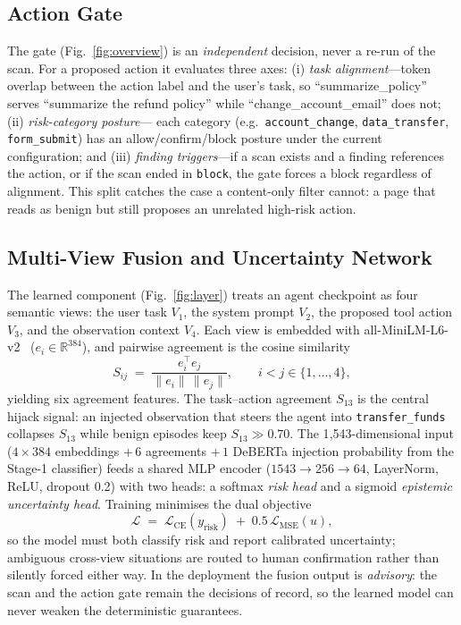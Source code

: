 \documentclass[journal]{IEEEtran}
\begin{document}
\subsection{Action Gate}
The gate (Fig.~\ref{fig:overview}) is an \emph{independent} decision, never
a re-run of the scan. For a proposed action it evaluates three axes:
(i) \emph{task alignment}---token overlap between the action label and the
user's task, so ``summarize\_policy'' serves ``summarize the refund policy''
while ``change\_account\_email'' does not; (ii) \emph{risk-category posture}---
each category (e.g.\ \texttt{account\_change}, \texttt{data\_transfer},
\texttt{form\_submit}) has an allow/confirm/block posture under the current
configuration; and (iii) \emph{finding triggers}---if a scan exists and a
finding references the action, or if the scan ended in \texttt{block}, the
gate forces a block regardless of alignment. This split catches the case a
content-only filter cannot: a page that reads as benign but still proposes an
unrelated high-risk action.

\subsection{Multi-View Fusion and Uncertainty Network}
\label{sec:fusion}
The learned component (Fig.~\ref{fig:layer}) treats an agent checkpoint as
four semantic views: the user task $V_1$, the system prompt $V_2$, the
proposed tool action $V_3$, and the observation context $V_4$. Each view is
embedded with all-MiniLM-L6-v2~\cite{reimers2019} ($e_i \in
\mathbb{R}^{384}$), and pairwise agreement is the cosine similarity
\begin{equation}
S_{ij} \;=\; \frac{e_i^{\!\top} e_j}{\lVert e_i\rVert\,\lVert e_j\rVert},
\qquad i<j \in \{1,\dots,4\},
\label{eq:cosine}
\end{equation}
yielding six agreement features. The task--action agreement $S_{13}$ is the
central hijack signal: an injected observation that steers the agent into
\texttt{transfer\_funds} collapses $S_{13}$ while benign episodes keep
$S_{13}\gg 0.70$. The 1{,}543-dimensional input
($4\times384$ embeddings $+\,6$ agreements $+\,1$ DeBERTa injection
probability from the Stage-1 classifier) feeds a shared MLP encoder
($1543\!\to\!256\!\to\!64$, LayerNorm, ReLU, dropout 0.2) with two heads: a
softmax \emph{risk head} and a sigmoid \emph{epistemic uncertainty head}.
Training minimises the dual objective
\begin{equation}
\mathcal{L} \;=\; \mathcal{L}_{\mathrm{CE}}(y_{\mathrm{risk}}) \;+\;
0.5\,\mathcal{L}_{\mathrm{MSE}}(u),
\label{eq:loss}
\end{equation}
so the model must both classify risk and report calibrated uncertainty;
ambiguous cross-view situations are routed to human confirmation rather than
silently forced either way. In the deployment the fusion output is
\emph{advisory}: the scan and the action gate remain the decisions of record,
so the learned model can never weaken the deterministic guarantees.
\end{document}
